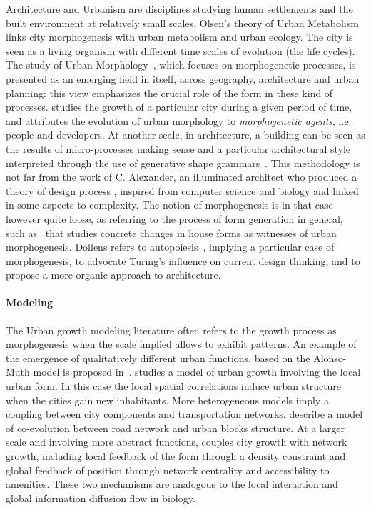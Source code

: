 \documentclass[fleqn,10pt]{wlscirep}
\begin{document}
Architecture and Urbanism are disciplines studying human settlements and the built environment at relatively small scales. Olsen's theory of Urban Metabolism \cite{olsen1982urban} links city morphogenesis with urban metabolism and urban ecology. The city is seen as a living organism with different time scales of evolution (the life cycles). The study of Urban Morphology~\cite{moudon1997urban}, which focuses on morphogenetic processes, is presented as an emerging field in itself, across geography, architecture and urban planning: this view emphasizes the crucial role of the form in these kind of processes. \cite{burke1972dublin} studies the growth of a particular city during a given period of time, and attributes the evolution of urban morphology to \emph{morphogenetic agents}, i.e. people and developers. At another scale, in architecture, a building can be seen as the results of micro-processes making sense and a particular architectural style interpreted through the use of generative shape grammars~\cite{ceccarini2001essai}. This methodology is not far from the work of C. Alexander, an illuminated architect who produced a theory of design process \cite{mehaffy2007notes}, inspired from computer science and biology and linked in some aspects to complexity. The notion of morphogenesis is in that case however quite loose, as referring to the process of form generation in general, such as~\cite{whitehand1999urban} that studies concrete changes in house forms as witnesses of urban morphogenesis. Dollens refers to autopoiesis~\cite{dollens2014alan}, implying a particular case of morphogenesis, to advocate Turing's influence on current design thinking, and to propose a more organic approach to architecture.






\paragraph{Modeling}

The Urban growth modeling literature often refers to the growth process as morphogenesis when the scale implied allows to exhibit patterns. An example of the emergence of qualitatively different urban functions, based on the Alonso-Muth model is proposed in~\cite{bonin2012modele}. \cite{makse1998modeling} studies a model of urban growth involving the local urban form. In this case the local spatial correlations induce urban structure when the cities gain new inhabitants. More heterogeneous models imply a coupling between city components and transportation networks. \cite{achibet2014model} describe a model of co-evolution between road network and urban blocks structure. At a larger scale and involving more abstract functions, \cite{raimbault2014hybrid} couples city growth with network growth, including local feedback of the form through a density constraint and global feedback of position through network centrality and accessibility to amenities. These two mechanisms are analogous to the local interaction and global information diffusion flow in biology.
\end{document}
